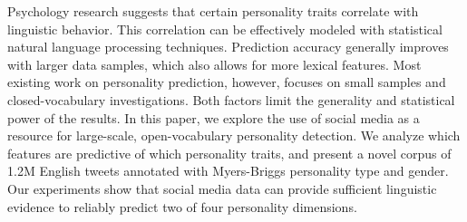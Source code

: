 Psychology research suggests that certain personality traits correlate with linguistic behavior. This correlation can be effectively modeled with statistical natural language processing techniques. Prediction accuracy generally improves with larger data samples, which also allows for more lexical features. Most existing work on personality prediction, however, focuses on small samples and closed-vocabulary investigations. Both factors limit the generality and statistical power of the results. In this paper, we explore the use of social media as a resource for large-scale, open-vocabulary personality detection. We analyze which features are predictive of which personality traits, and present a novel corpus of 1.2M English tweets annotated with Myers-Briggs personality type and gender. Our experiments show that social media data can provide sufficient linguistic evidence to reliably predict two of four personality dimensions.
